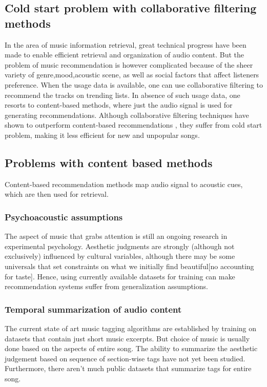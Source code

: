 \subsection{Cold start problem with collaborative filtering methods}
In the area of music information retrieval, great technical progress have been made to enable efficient retrieval and organization of audio content. But the problem of music recommendation is  however complicated because of the sheer variety of genre,mood,acoustic scene, as well as social factors that affect listeners preference. When the usage data is available, one can use collaborative filtering to recommend the tracks on trending lists. In absence of such usage data, one resorts to content-based methods, where just the audio signal is used for generating recommendations.  Although collaborative filtering techniques have shown to outperform content-based recommendations \cite{DC1}, they suffer from cold start problem, making it less efficient for new and unpopular songs. 


\subsection{Problems with content based methods}
Content-based recommendation methods map audio signal to acoustic cues, which are then used for retrieval.

\subsubsection{Psychoacoustic assumptions}
The aspect of music that grabs attention is still an ongoing research in experimental psychology. Aesthetic judgments are strongly (although not exclusively) influenced by cultural variables, although there may be some universals that set constraints on what we initially find beautiful[no accounting for taste]. Hence, using currently available datasets\cite{MSD}\cite{MTT} for training can make recommendation systems suffer from generalization assumptions.  

\subsubsection{Temporal summarization of audio content}
The current state of art music tagging algorithms\cite{choi_crnn}\cite{MultiScale} are established by training on datasets that contain just short music excerpts. But choice of music is usually done based on the aspects of entire song. The ability to summarize the aesthetic judgement based on sequence of section-wise tags have not yet been studied. Furthermore, there aren’t much public datasets that summarize tags for entire song. 


